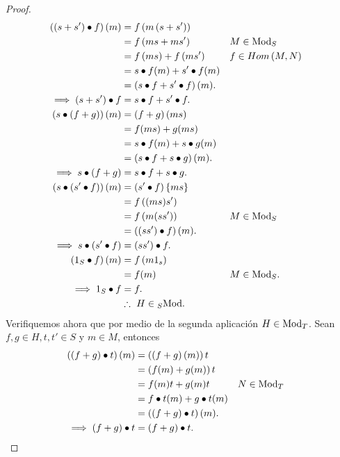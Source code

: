\documentclass{article}
\begin{document}
\begin{enumerate}[label=\textbf{Ej \arabic*.}]
\begin{proof}
			\begin{align*}
				\lrprth{\lrprth{s+s'}\bullet f}(m)&=f\lrprth{m\lrprth{s+s'}}\\
				&=f\lrprth{ms+ms'} && M\in\ringmod{S}{\text{Mod}}{r}\\
				&=f\lrprth{ms}+f\lrprth{ms'} && f\in Hom\lrprth{M,N}\\
				&=s\bullet f (m)+s'\bullet f (m)\\
				&=\lrprth{s\bullet f+ s'\bullet f}(m).\\
				\implies \lrprth{s+s'}\bullet f&= s\bullet f+ s'\bullet f.\\
				\lrprth{s\bullet\lrprth{f+g}}(m)&=\lrprth{f+g}\lrprth{ms}\\
				&=f(ms)+g(ms)\\
				&=s\bullet f (m)+ s\bullet g (m)\\
				&=\lrprth{s\bullet f+ s\bullet g }(m).\\
				\implies s\bullet\lrprth{f+g}&= s\bullet f+ s\bullet g.\\
				\lrprth{s\bullet\lrprth{s'\bullet f}}(m)&=\lrprth{s'\bullet f}\lrbrack{ms}\\
				&=f\lrprth{(ms)s'}\\
				&=f\lrprth{m(ss')} && M\in\ringmod{S}{\text{Mod}}{r}\\
				&=\lrprth{\lrprth{ss'}\bullet f}(m).\\
				\implies s\bullet\lrprth{s'\bullet f}&= \lrprth{ss'}\bullet f.\\
				\lrprth{1_S\bullet f}(m)&=f\lrprth{m1_s}\\
				&=f(m) && M\in\ringmod{S}{\text{Mod}}{r}.\\
				\implies 1_S\bullet f&= f.\\
				&\therefore\ H\in\ringmod{S}{\text{Mod}}{l}.
			\end{align*} 
			Verifiquemos ahora que por medio de la segunda aplicación $H\in\ringmod{T}{\text{Mod}}{r}$. Sean $f,g\in H, t,t'\in S$ y $m\in M$, entonces
			\begin{align*}
				\lrprth{\lrprth{f+g}\bullet t}(m)&=\lrprth{\lrprth{f+g}(m)}t\\
				&=\lrprth{f(m)+g(m)}t\\
				&=f(m)t+g(m)t && N\in\ringmod{T}{\text{Mod}}{r}\\
				&=f\bullet t(m)+g\bullet t(m)\\
				&=\lrprth{\lrprth{f+g}\bullet t}(m).\\
				\implies \lrprth{f+g}\bullet t&= \lrprth{f+g}\bullet t.\\

\end{align*}
\end{proof}
\end{enumerate}
\end{document}
